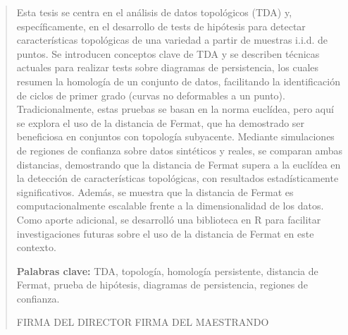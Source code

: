 
\begin{abstract}
    Esta tesis se centra en el análisis de datos topológicos (TDA) y, específicamente, en el desarrollo de tests de hipótesis para detectar características topológicas de una variedad a partir de muestras i.i.d. de puntos. Se introducen conceptos clave de TDA y se describen técnicas actuales para realizar tests sobre diagramas de persistencia, los cuales resumen la homología de un conjunto de datos, facilitando la identificación de ciclos de primer grado (curvas no deformables a un punto). Tradicionalmente, estas pruebas se basan en la norma euclídea, pero aquí se explora el uso de la distancia de Fermat, que ha demostrado ser beneficiosa en conjuntos con topología subyacente. Mediante simulaciones de regiones de confianza sobre datos sintéticos y reales, se comparan ambas distancias, demostrando que la distancia de Fermat supera a la euclídea en la detección de características topológicas, con resultados estadísticamente significativos. Además, se muestra que la distancia de Fermat es computacionalmente escalable frente a la dimensionalidad de los datos. Como aporte adicional, se desarrolló una biblioteca en R para facilitar investigaciones futuras sobre el uso de la distancia de Fermat en este contexto.


    \textbf{Palabras clave:} TDA, topología, homología persistente, distancia de Fermat, prueba de hipótesis, diagramas de persistencia, regiones de confianza.

    \begin{flushleft}
        \vfill
        FIRMA DEL DIRECTOR \hfill FIRMA DEL MAESTRANDO
    \end{flushleft}

\end{abstract}

\newpage

